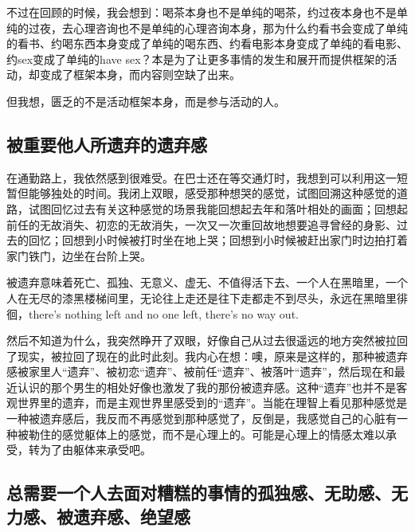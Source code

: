 不过在回顾的时候，我会想到：喝茶本身也不是单纯的喝茶，约过夜本身也不是单纯的过夜，去心理咨询也不是单纯的心理咨询本身，那为什么约看书会变成了单纯的看书、约喝东西本身变成了单纯的喝东西、约看电影本身变成了单纯的看电影、约sex变成了单纯的have sex？本是为了让更多事情的发生和展开而提供框架的活动，却变成了框架本身，而内容则空缺了出来。

但我想，匮乏的不是活动框架本身，而是参与活动的人。







\subsection*{被重要他人所遗弃的遗弃感}

在通勤路上，我依然感到很难受。在巴士还在等交通灯时，我想到可以利用这一短暂但能够独处的时间。我闭上双眼，感受那种想哭的感觉，试图回溯这种感觉的道路，试图回忆过去有关这种感觉的场景\pozhehao{}我能回想起去年和落叶相处的画面；回想起前任的无故消失、初恋的无故消失，一次又一次重回故地想要追寻曾经的身影、过去的回忆；回想到小时候被打时坐在地上哭；回想到小时候被赶出家门时边拍打着家门铁门，边坐在台阶上哭。

被遗弃意味着死亡、孤独、无意义、虚无、不值得活下去、一个人在黑暗里，一个人在无尽的漆黑楼梯间里，无论往上走还是往下走都走不到尽头，永远在黑暗里徘徊，there's nothing left and no one left, there's no way out.

然后不知道为什么，我突然睁开了双眼，好像自己从过去很遥远的地方突然被拉回了现实，被拉回了现在的此时此刻。我内心在想：噢，原来是这样的，那种被遗弃感\pozhehao{}被家里人“遗弃”、被初恋“遗弃”、被前任“遗弃”、被落叶“遗弃”，然后现在和最近认识的那个男生的相处好像也激发了我的那份被遗弃感。这种“遗弃”也并不是客观世界里的遗弃，而是主观世界里感受到的“遗弃”。当能在理智上看见那种感觉是一种被遗弃感后，我反而不再感觉到那种感觉了，反倒是，我感觉自己的心脏有一种被勒住的感觉\pozhehao{}躯体上的感觉，而不是心理上的。可能是心理上的情感太难以承受，转为了由躯体来承受吧。







\subsection*{总需要一个人去面对糟糕的事情的孤独感、无助感、无力感、被遗弃感、绝望感}

